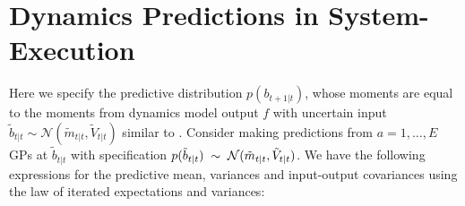 \documentclass{article}
\newcommand{\N}{\mathcal{N}}
\newcommand{\unot}[1]{\tilde #1_{t|t}}     %
\newcommand{\pne}[1]{#1_{t+1|t}}   %
\newcommand{\fb}{f} %
\newcommand{\bm}{m} %
\begin{document}
\newpage
\section{Dynamics Predictions in System-Execution} \label{sec:app-instantiation-prediction} %
Here we specify the predictive distribution $p(\pne{b})$,
whose moments are equal to the moments from dynamics model output $\fb$ with uncertain input
$\unot{b}\sim\N(\unot{\bm},\unot{V})$ similar to \citet{pilco}.
%
Consider making predictions from $a=1,\ldots,E$ GPs at $\unot{b}$ with specification
$p(\unot{b})\;\sim\;{\cal N}(\unot{\bm}, \unot{V})$.
%
We have the following expressions for the predictive mean, variances
and input-output covariances using the law of iterated expectations and variances:
\end{document}
